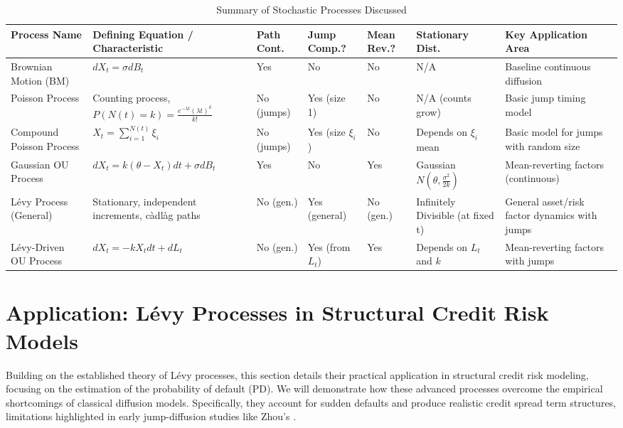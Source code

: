 \documentclass[11pt,twoside,openright]{report}
\begin{document}
\begin{table}[h!]
\scriptsize %
\centering
\caption{Summary of Stochastic Processes Discussed}
\label{tab:process_summary}
\begin{tabular}{@{}p{2.0cm}p{3.0cm}p{1.0cm}p{1.0cm}p{1.0cm}p{2.0cm}p{2.5cm}@{}}
\toprule
Process Name & Defining Equation / Characteristic & Path Cont. & Jump Comp.? & Mean Rev.? & Stationary Dist. & Key Application Area \\
\midrule
Brownian Motion (BM) & $dX_t = \sigma dB_t$ & Yes & No & No & N/A & Baseline continuous diffusion \\
Poisson Process & Counting process, $P(N(t)=k)=\frac{e^{-\lambda t}(\lambda t)^k}{k!}$ & No (jumps) & Yes (size 1) & No & N/A (counts grow) & Basic jump timing model \\
Compound Poisson Process & $X_t = \sum_{i=1}^{N(t)} \xi_i$ & No (jumps) & Yes (size $\xi_i$) & No & Depends on $\xi_i$ mean & Basic model for jumps with random size \\
Gaussian OU Process & $dX_t = k(\theta-X_t)dt + \sigma dB_t$ & Yes & No & Yes & Gaussian $N(\theta,\frac{\sigma^2}{2k})$ & Mean-reverting factors (continuous) \\
Lévy Process (General) & Stationary, independent increments, càdlàg paths & No (gen.) & Yes (general) & No (gen.) & Infinitely Divisible (at fixed t) & General asset/risk factor dynamics with jumps \\
Lévy-Driven OU Process & $dX_t = -k X_t dt + dL_t$ & No (gen.) & Yes (from $L_t$) & Yes & Depends on $L_t$ and $k$ & Mean-reverting factors with jumps \\
\bottomrule
\end{tabular}
\end{table}




\section{Application: Lévy Processes in Structural Credit Risk Models}
\label{sec:application_structural}

Building on the established theory of Lévy processes, this section details their practical application in structural credit risk modeling, focusing on the estimation of the probability of default (PD). We will demonstrate how these advanced processes overcome the empirical shortcomings of classical diffusion models. Specifically, they account for sudden defaults and produce realistic credit spread term structures, limitations highlighted in early jump-diffusion studies like Zhou's \cite{zhou1997jump}.
\end{document}
